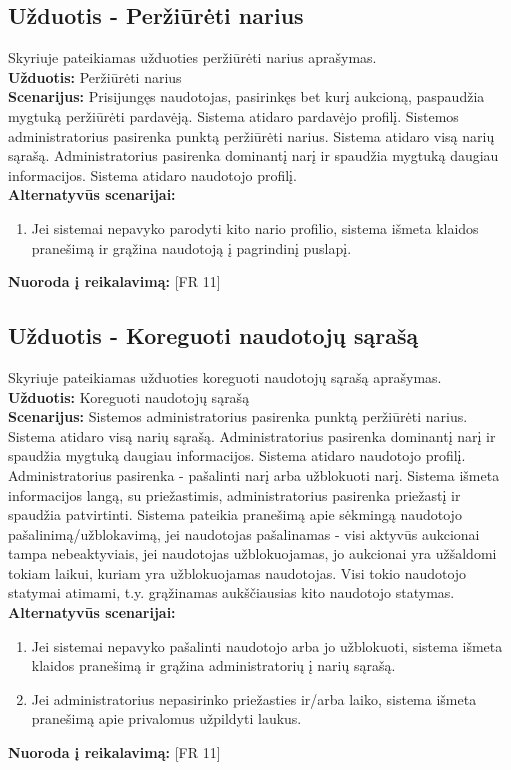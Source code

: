 \documentclass{VUMIFPSkursinis}
\begin{document}
	\subsection{Užduotis - Peržiūrėti narius}
	Skyriuje pateikiamas užduoties peržiūrėti narius aprašymas.\\
	\textbf{Užduotis:}  Peržiūrėti narius \\
	\textbf{Scenarijus:}  Prisijungęs naudotojas, pasirinkęs bet kurį aukcioną, paspaudžia mygtuką peržiūrėti pardavėją. Sistema atidaro pardavėjo profilį. Sistemos administratorius pasirenka punktą peržiūrėti narius. Sistema atidaro visą narių sąrašą. Administratorius pasirenka dominantį narį ir spaudžia mygtuką daugiau informacijos. Sistema atidaro naudotojo profilį. \\
	\textbf{Alternatyvūs scenarijai:}
	\begin{enumerate}
		\item Jei sistemai nepavyko parodyti kito nario profilio, sistema išmeta klaidos pranešimą ir grąžina naudotoją į pagrindinį puslapį.
	\end{enumerate}
	\textbf{Nuoroda į reikalavimą: } [FR 11]

	\subsection{Užduotis - Koreguoti naudotojų sąrašą}
	Skyriuje pateikiamas užduoties koreguoti naudotojų sąrašą aprašymas.\\
	\textbf{Užduotis:}  Koreguoti naudotojų sąrašą \\
	\textbf{Scenarijus:} Sistemos administratorius pasirenka punktą peržiūrėti narius. Sistema atidaro visą narių sąrašą. Administratorius pasirenka dominantį narį ir spaudžia mygtuką daugiau informacijos. Sistema atidaro naudotojo profilį. Administratorius pasirenka - pašalinti narį arba užblokuoti narį. Sistema išmeta informacijos langą, su priežastimis, administratorius pasirenka priežastį ir spaudžia patvirtinti. Sistema pateikia pranešimą apie sėkmingą naudotojo pašalinimą/užblokavimą, jei naudotojas pašalinamas - visi aktyvūs aukcionai tampa nebeaktyviais, jei naudotojas užblokuojamas, jo aukcionai yra užšaldomi tokiam laikui, kuriam yra užblokuojamas naudotojas. Visi tokio naudotojo statymai atimami, t.y. grąžinamas aukščiausias kito naudotojo statymas. \\
	\textbf{Alternatyvūs scenarijai:}
	\begin{enumerate}
		\item Jei sistemai nepavyko pašalinti naudotojo arba jo užblokuoti, sistema išmeta klaidos pranešimą ir grąžina administratorių į narių sąrašą.
		\item Jei administratorius nepasirinko priežasties ir/arba laiko, sistema išmeta pranešimą apie privalomus užpildyti laukus.
	\end{enumerate}
	\textbf{Nuoroda į reikalavimą: } [FR 11]
\end{document}
